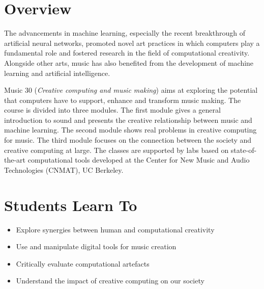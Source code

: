 \documentclass[letterpaper]{inzane_syllabus} %
\begin{document}

\makeprofile %

\section{Overview}

 The advancements in machine learning, especially the recent breakthrough of artificial neural networks, promoted novel art practices in which computers play a fundamental role and fostered research in the field of computational creativity. Alongside other arts, music has also benefited from the development of machine learning and artificial intelligence.

 \textcolor{myCOLOR}{Music 30 (\emph{Creative computing and music making})} aims at exploring the potential that computers have to support, enhance and transform music making. The course is divided into three modules. The first module gives a general introduction to sound and presents the creative relationship between music and machine learning. The second module shows real problems in creative computing for music. The third module focuses on the connection between the society and creative computing at large. The classes are supported by labs based on state-of-the-art computational tools developed at the Center for New Music and Audio Technologies (CNMAT), UC Berkeley.


\vspace{0.5cm}
\section{Students Learn To}

\begin{itemize}
\item Explore synergies between human and computational creativity 
\item Use and manipulate digital tools for music creation
\item Critically evaluate computational artefacts
\item Understand the impact of creative computing on our society
\end{itemize}
\end{document}
